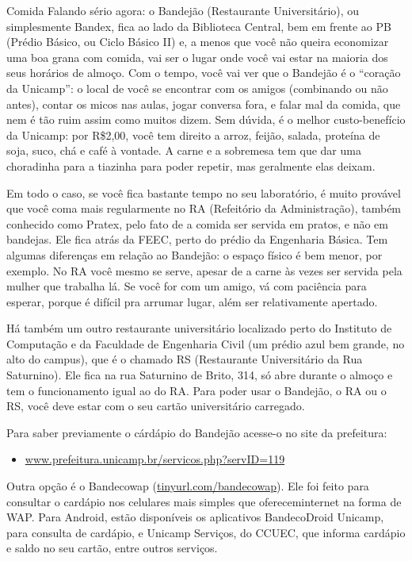 \begin{story}{Comida}
Falando sério agora: o Bandejão (Restaurante Universitário), ou simplesmente Bandex, fica ao lado da Biblioteca Central, bem em frente ao PB (Prédio Básico, ou Ciclo Básico II) e, a menos que você não queira economizar uma boa grana com comida, vai ser o lugar onde você vai estar na maioria dos seus horários de almoço. Com o tempo, você vai ver que o Bandejão é o ``coração da Unicamp'': o local de você se encontrar com os amigos (combinando ou não antes), contar os micos nas aulas, jogar conversa fora, e falar mal da comida, que nem é tão ruim assim como muitos dizem. Sem dúvida, é o melhor custo-benefício da Unicamp: por R\$2,00, você tem direito a arroz, feijão, salada, proteína de soja, suco, chá e café à vontade. A carne e a sobremesa tem que dar uma choradinha para a tiazinha para poder repetir, mas geralmente elas deixam.

Em todo o caso, se você fica bastante tempo no seu laboratório, é muito provável que você coma mais regularmente no RA (Refeitório da Administração), também conhecido como Pratex, pelo fato de a comida ser servida em pratos, e não em bandejas. Ele fica atrás da FEEC, perto do prédio da Engenharia Básica. Tem algumas diferenças em relação ao Bandejão: o espaço físico é bem menor, por exemplo. No RA você mesmo se serve, apesar de a carne às vezes ser servida pela mulher que trabalha lá. Se você for com um amigo, vá com paciência para esperar, porque é difícil pra arrumar lugar, além ser relativamente apertado.

Há também um outro restaurante universitário localizado perto do Instituto de Computação e da Faculdade de Engenharia Civil (um prédio azul bem grande, no alto do campus), que é o chamado RS (Restaurante Universitário da Rua Saturnino). Ele fica na rua Saturnino de Brito, 314, só abre durante o almoço e tem o funcionamento igual ao do RA. Para poder usar o Bandejão, o RA ou o RS, você deve estar com o seu cartão universitário carregado.

Para saber previamente o cárdápio do Bandejão acesse-o no site da prefeitura:

\begin{itemize}
\item \url{www.prefeitura.unicamp.br/servicos.php?servID=119}
\end{itemize}

Outra opção é o Bandecowap (\url{tinyurl.com/bandecowap}). Ele foi feito para consultar o cardápio nos celulares mais simples que ofereceminternet na forma de WAP. Para Android, estão disponíveis os aplicativos BandecoDroid Unicamp, para consulta de cardápio, e Unicamp Serviços, do CCUEC, que informa cardápio e saldo no seu cartão, entre outros serviços.


\end{story}
